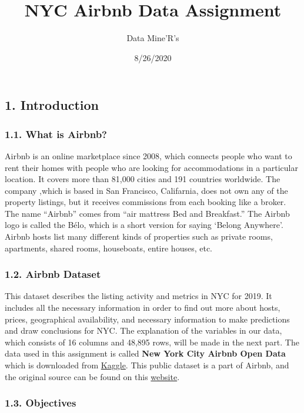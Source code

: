 \documentclass[
]{article}
\title{NYC Airbnb Data Assignment}
\author{Data Mine'R's}
\date{8/26/2020}
\begin{document}
\maketitle

{
\setcounter{tocdepth}{3}
\tableofcontents
}
\hypertarget{introduction}{%
\subsection{1. Introduction}\label{introduction}}

\hypertarget{what-is-airbnb}{%
\subsubsection{1.1. What is Airbnb?}\label{what-is-airbnb}}

Airbnb is an online marketplace since 2008, which connects people who
want to rent their homes with people who are looking for accommodations
in a particular location. It covers more than 81,000 cities and 191
countries worldwide. The company ,which is based in San Francisco,
Califarnia, does not own any of the property listings, but it receives
commissions from each booking like a broker. The name ``Airbnb'' comes
from ``air mattress Bed and Breakfast.'' The Airbnb logo is called the
Bélo, which is a short version for saying `Belong Anywhere'. Airbnb
hosts list many different kinds of properties such as private rooms,
apartments, shared rooms, houseboats, entire houses, etc.

\hypertarget{airbnb-dataset}{%
\subsubsection{1.2. Airbnb Dataset}\label{airbnb-dataset}}

This dataset describes the listing activity and metrics in NYC for 2019.
It includes all the necessary information in order to find out more
about hosts, prices, geographical availability, and necessary
information to make predictions and draw conclusions for NYC. The
explanation of the variables in our data, which consists of 16 columns
and 48,895 rows, will be made in the next part. The data used in this
assignment is called \textbf{New York City Airbnb Open Data} which is
downloaded from
\href{https://www.kaggle.com/dgomonov/new-york-city-airbnb-open-data}{Kaggle}.
This public dataset is a part of Airbnb, and the original source can be
found on this \href{http://insideairbnb.com/}{website}.

\hypertarget{objectives}{%
\subsubsection{1.3. Objectives}\label{objectives}}
\end{document}
